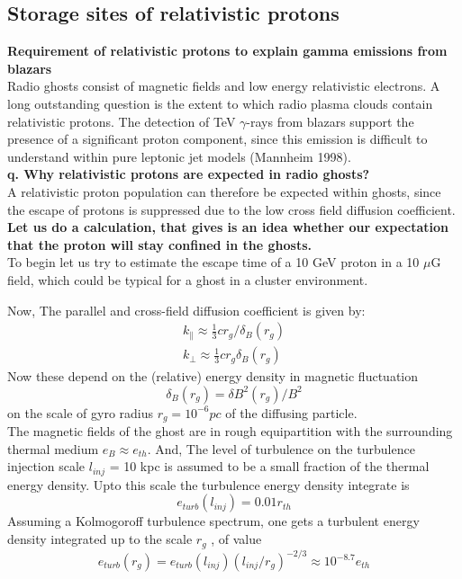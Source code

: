 \documentclass[11pt]{report}
\newcommand{\tbf}[1]{\textbf{#1}}
\newcommand{\cc}[1]{\left({#1}\right)}
\begin{document}
\subsection{Storage sites of relativistic protons}
\tbf{Requirement of relativistic protons to explain gamma emissions from blazars}\\

Radio ghosts consist of magnetic fields and low energy relativistic electrons. A long outstanding question is the extent to which radio plasma clouds contain relativistic protons. The detection of TeV $\gamma$-rays from blazars support the presence of a significant proton component, since this emission is difficult to understand within pure leptonic jet models (Mannheim 1998). \\

\tbf{q. Why relativistic protons are expected in radio ghosts?}\\

A relativistic proton population can therefore be expected within ghosts, since the escape of protons is suppressed due to the low cross field diffusion coefficient.\\

\tbf{Let us do a calculation, that gives is an idea whether our expectation that the proton will stay confined in the ghosts.}\\

To begin let us try to estimate  the escape time of a 10 GeV proton in a 10 $\mu$G field, which could be typical for a ghost in a cluster environment.

Now, The parallel and cross-field diffusion coefficient is given by:
\begin{eqnarray}
k_\parallel \approx \frac{1}{3}cr_g/\delta_B(r_g)\\
k_\perp \approx \frac{1}{3}cr_g\delta_B(r_g)
\end{eqnarray}
 Now these depend on the (relative) energy density in magnetic fluctuation
\begin{equation}
\delta_B(r_g)=\delta B^2(r_g)/B^2
\end{equation} 
on the scale of gyro radius $r_g=10^{-6}pc$ of the diffusing particle.\\

 The magnetic fields of the ghost are in rough equipartition with the surrounding thermal medium $e_B\approx e_{th}$. And, 
 The level of turbulence on the turbulence injection scale $l_{inj}$ = 10 kpc is assumed to be a small fraction of the thermal energy density. Upto this scale  the turbulence energy density integrate is 
 \begin{equation}
 e_{turb}(l_{inj})=0.01r_{th}
 \end{equation}
  Assuming a Kolmogoroff turbulence spectrum, one gets a turbulent energy density integrated up to the scale $r_g$ , of value
  \begin{equation}
  e_{turb}(r_g)=e_{turb}(l_{inj})\cc{l_{inj}/r_g}^{-2/3}\approx 10^{-8.7} e_{th}
  \end{equation}
  
\end{document}
